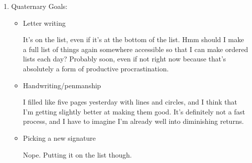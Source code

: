 \documentclass[12pt]{article}
\renewcommand{\,}{\textsuperscript{,}}
\begin{document}
\begin{enumerate}
\begin{itemize}
\end{itemize}

\item Quaternary Goals:

\begin{itemize}

\item Letter writing

It's on the list, even if it's at the bottom of the list.  
Hmm should I make a full list of things again somewhere accessible so that I can make ordered lists each day?  
Probably soon, even if not right now because that's absolutely a form of productive procrastination.

\item Handwriting/penmanship

I filled like five pages yesterday with lines and circles, and I think that I'm getting slightly better at making them good. It's definitely not a fast process, and I have to imagine I'm already well into diminishing returns.

\item Picking a new signature

Nope. Putting it on the list though.

\end{itemize}

\end{enumerate}
\end{document}
